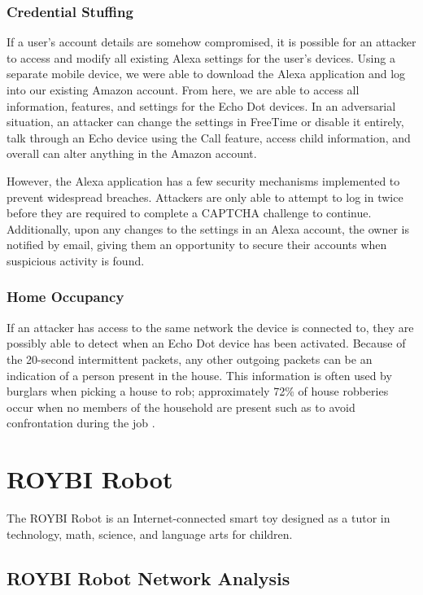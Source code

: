\documentclass[12pt]{ucthesis}
\begin{document}
\subsubsection{Credential Stuffing}
If a user's account details are somehow compromised, it is possible for an attacker to access and modify all existing Alexa settings for the user's devices. Using a separate mobile device, we were able to download the Alexa application and log into our existing Amazon account. From here, we are able to access all information, features, and settings for the Echo Dot devices. In an adversarial situation, an attacker can change the settings in FreeTime or disable it entirely, talk through an Echo device using the Call feature, access child information, and overall can alter anything in the Amazon account.  

However, the Alexa application has a few security mechanisms implemented to prevent widespread breaches. Attackers are only able to attempt to log in twice before they are required to complete a CAPTCHA \cite{captcha} challenge to continue. Additionally, upon any changes to the settings in an Alexa account, the owner is notified by email, giving them an opportunity to secure their accounts when suspicious activity is found.

\subsubsection{Home Occupancy}
If an attacker has access to the same network the device is connected to, they are possibly able to detect when an Echo Dot device has been activated. Because of the 20-second intermittent packets, any other outgoing packets can be an indication of a person present in the house. This information is often used by burglars when picking a house to rob; approximately 72\% of house robberies occur when no members of the household are present such as to avoid confrontation during the job \cite{burglar}. 

\section{ROYBI Robot}
The ROYBI Robot is an Internet-connected smart toy designed as a tutor in technology, math, science, and language arts for children. 

\subsection{ROYBI Robot Network Analysis}
\end{document}
